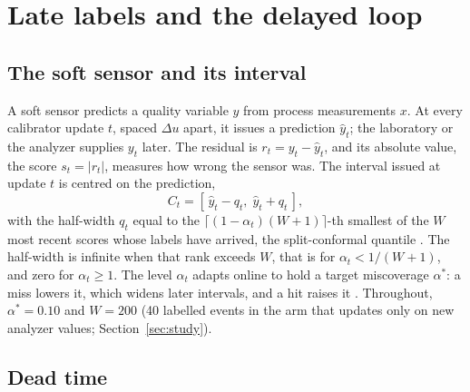 \section{Late labels and the delayed loop}\label{sec:loop}

\subsection{The soft sensor and its interval}\label{sec:loop:interval}

A soft sensor predicts a quality variable $y$ from process measurements $x$. At every calibrator
update $t$, spaced $\Delta u$ apart, it issues a prediction $\hat y_t$; the laboratory or the
analyzer supplies $y_t$ later. The residual is $r_t = y_t - \hat y_t$, and its absolute value, the
score $s_t = |r_t|$, measures how wrong the sensor was. The interval issued at update $t$ is
centred on the prediction,
\begin{equation}
  C_t = [\,\hat y_t - q_t,\; \hat y_t + q_t\,],
  \label{eq:interval}
\end{equation}
with the half-width $q_t$ equal to the $\lceil (1-\alpha_t)(W+1)\rceil$-th smallest of the $W$
most recent scores whose labels have arrived, the split-conformal quantile
\citep{papadopoulos2002}. The half-width is infinite when that rank exceeds $W$, that is for
$\alpha_t < 1/(W+1)$, and zero for $\alpha_t \ge 1$. The level $\alpha_t$ adapts online to hold
a target miscoverage $\alpha^\ast$: a miss lowers it, which widens later intervals, and a hit
raises it \citep{gibbs2021aci}. Throughout, $\alpha^\ast = 0.10$ and $W = 200$ (40 labelled
events in the arm that updates only on new analyzer values; Section~\ref{sec:study}).

\subsection{Dead time}\label{sec:loop:deadtime}

